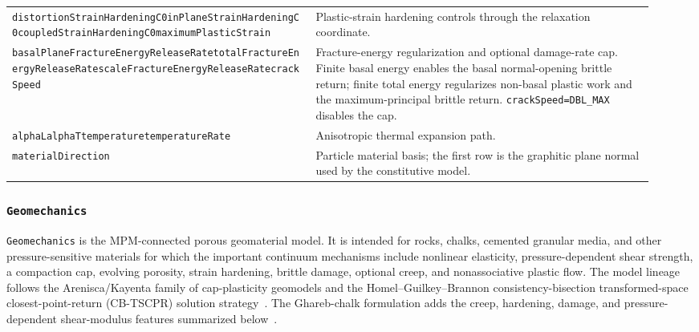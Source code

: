 \begin{longtable}{>{\raggedright\arraybackslash}p{0.44\linewidth}>{\raggedright\arraybackslash}p{0.49\linewidth}}
\texttt{distortionStrainHardeningC0}\newline \texttt{inPlaneStrainHardeningC0}\newline \texttt{coupledStrainHardeningC0}\newline \texttt{maximumPlasticStrain} & Plastic-strain hardening controls through the relaxation coordinate.\\
\texttt{basalPlaneFractureEnergyReleaseRate}\newline \texttt{totalFractureEnergyReleaseRate}\newline \texttt{scaleFractureEnergyReleaseRate}\newline \texttt{crackSpeed} & Fracture-energy regularization and optional damage-rate cap.  Finite basal energy enables the basal normal-opening brittle return; finite total energy regularizes non-basal plastic work and the maximum-principal brittle return.  \texttt{crackSpeed=DBL\_MAX} disables the cap.\\
\texttt{alphaL}\newline \texttt{alphaT}\newline \texttt{temperature}\newline \texttt{temperatureRate} & Anisotropic thermal expansion path.\\
\texttt{materialDirection} & Particle material basis; the first row is the graphitic plane normal used by the constitutive model.\\
\bottomrule
\end{longtable}
\endgroup

\subsubsection{\texttt{Geomechanics}}
\label{subsubsec:geomechanics-model}

\texttt{Geomechanics} is the MPM-connected porous geomaterial model.  It is intended for rocks, chalks, cemented granular media, and other pressure-sensitive materials for which the important continuum mechanisms include nonlinear elasticity, pressure-dependent shear strength, a compaction cap, evolving porosity, strain hardening, brittle damage, optional creep, and nonassociative plastic flow.  The model lineage follows the Arenisca/Kayenta family of cap-plasticity geomodels and the Homel--Guilkey--Brannon consistency-bisection transformed-space closest-point-return (CB-TSCPR) solution strategy~\cite{brannon2009kayenta,homel2014arenisca,homel2015cbtscpr}.  The Ghareb-chalk formulation adds the creep, hardening, damage, and pressure-dependent shear-modulus features summarized below~\cite{malenda2025ghareb}.

